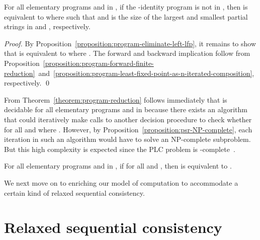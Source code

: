 \documentclass{llncs}
\begin{document}
\begin{theorem}
\label{theorem:program-reduction}
For all elementary programs  and  in , if the -identity program  is not in , then  is equivalent to  where  such that  and  is the size of the largest and smallest partial strings in  and , respectively.
\end{theorem}
\begin{proof}
By Proposition~\ref{proposition:program-eliminate-left-lfp}, it remains to show that  is equivalent to  where . The forward and backward implication follow from Proposition~\ref{proposition:program-forward-finite-reduction}~and~\ref{proposition:program-least-fixed-point-as-n-iterated-composition}, respectively. \qed
\end{proof}

From Theorem~\ref{theorem:program-reduction} follows immediately that  is decidable for all elementary programs  and  in  because there exists an algorithm that could iteratively make  calls to another decision procedure to check whether  for all  and  where . However, by Proposition~\ref{proposition:psr-NP-complete}, each iteration in such an algorithm would have to solve an NP-complete subproblem. But this high complexity is expected since the PLC problem is -complete~\cite{FKL1993}.

\begin{corollary}
For all elementary programs  and  in , if  for all  and , then  is equivalent to .
\end{corollary}

We next move on to enriching our model of computation to accommodate a certain kind of relaxed sequential consistency.

\section{Relaxed sequential consistency}
\vspace{-0.3em}
\label{section:SC-relaxed}
\end{document}
